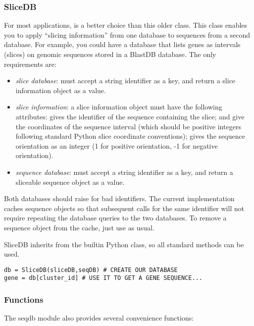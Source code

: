 \documentclass{howto}
\begin{document}
\subsubsection{SliceDB}
For most applications,  is a better choice than
this older class.
This class enables you to apply ``slicing information'' from 
one database to sequences from a second database.  For example,
you could have a database that lists genes as intervals (slices)
on genomic sequences stored in a BlastDB database.  The only
requirements are:
\begin{itemize}
\item
{\em slice database}: must accept a string identifier as a key,
and return a slice information object as a value.

\item
{\em slice information}: a slice information object must
have the following attributes:  gives the identifier
of the sequence containing the slice;  and 
give the coordinates of the sequence interval (which should be positive
integers following standard
Python slice coordinate conventions);  gives the sequence
orientation as an integer (1 for positive orientation, -1 for
negative orientation).

\item
{\em sequence database}: must accept a string identifier as a key,
and return a sliceable sequence object as a value.

\end{itemize}

Both databases should raise  for bad identifiers.
The current  implementation caches sequence objects so
that subsequent calls for the same identifier will not require
repeating the database queries to the two databases.  To
remove a sequence object from the cache, just use
 as usual.

SliceDB inherits from the builtin Python  class,
so all standard methods can be used.

\begin{verbatim}
db = SliceDB(sliceDB,seqDB) # CREATE OUR DATABASE
gene = db[cluster_id] # USE IT TO GET A GENE SEQUENCE...
\end{verbatim}



\subsubsection{Functions}
The seqdb module also provides several convenience functions:
\end{document}
